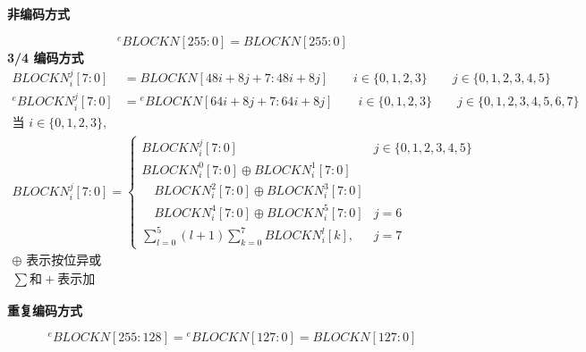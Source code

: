 \hypertarget{None}{\textbf{非编码方式}}
\begin{displaymath}
    {}^{e}\!BLOCKN[255\!:\!0] = BLOCKN[255\!:\!0]
\end{displaymath}
\hypertarget{frac_3_4}{\textbf{3/4 编码方式}}
\begin{align*}
    BLOCKN_{i}^{j}[7:0]
        &= BLOCKN[48i + 8j + 7 : 48i + 8j]
        \qquad i \in \{0,1,2,3\} \qquad j \in \{0,1,2,3,4,5\} \\
    {}^{e}\!BLOCKN_{i}^{j}[7:0]
        &= {}^{e}\!BLOCKN[64i + 8j + 7 : 64i + 8j]
        \qquad i \in \{0,1,2,3\} \qquad j \in \{0,1,2,3,4,5,6,7\}
\end{align*}
\begin{gather*}
    \text{当 } i \in \{0,1,2,3\}, \\
    BLOCKN_{i}^{j}[7:0] = 
    \begin{cases}
      BLOCKN_{i}^{j}[7:0] & j \in \{0,1,2,3,4,5\} \\[0.8em]
      BLOCKN_{i}^{0}[7:0] \oplus BLOCKN_{i}^{1}[7:0] \\
      \quad BLOCKN_{i}^{2}[7:0] \oplus BLOCKN_{i}^{3}[7:0] \\
      \quad BLOCKN_{i}^{4}[7:0] \oplus BLOCKN_{i}^{5}[7:0] & j = 6 \\[0.8em]
      \sum\limits_{l=0}^{5} (l+1) \sum\limits_{k=0}^{7} BLOCKN_{i}^{l}[k], & j = 7
    \end{cases} \\
    \oplus \text{ 表示按位异或} \\
    \sum \text{和} + \text{表示加}
  \end{gather*}


\hypertarget{Repeat}{\textbf{重复编码方式}}
\begin{displaymath}
    {}^{e}\!BLOCKN[255\!:\!128] = {}^{e}\!BLOCKN[127\!:\!0] = BLOCKN[127\!:\!0]
\end{displaymath}
